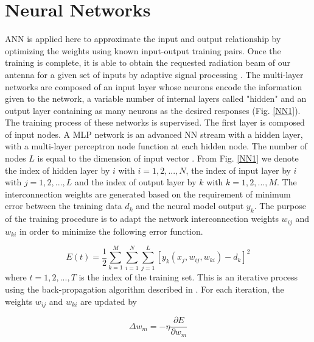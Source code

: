 \documentclass[conference]{IEEEtran}
\begin{document}
\section{Neural Networks}
ANN is applied here to approximate the input and output relationship by optimizing the weights using known input-output training pairs. Once the training is complete, it is able to obtain the requested radiation beam of our antenna for a given set of inputs by adaptive signal processing \cite{NN1}. The multi-layer networks are composed of an input layer whose neurons encode the information given to the network, a variable number of internal layers called "hidden" and an output layer containing as many neurons as the desired responses (Fig. \ref{NN1}). The training process of these networks is supervised. The first layer is composed of input nodes. A MLP network is an advanced NN stream with a hidden layer, with a multi-layer perceptron node function at each hidden node. The number of nodes $L$ is equal to the dimension of input vector \cite{a17}. From Fig. \ref{NN1} we denote the index of hidden layer by $i$ with $i = 1,2,...,N$, the index of input layer by $i$ with $j = 1,2,...,L$ and the index of output layer by $k$ with $k = 1,2,...,M$. The interconnection weights are generated based on the requirement of minimum error between the training data $d_k$ and the neural model output $y_k$. The purpose of the training procedure is to adapt the network interconnection weights $w_{ij}$ and $w_{ki}$ in order to minimize the following error function.

\begin{equation}
E\left( t \right) = \frac{1}{2}\sum\limits_{k = 1}^M {\sum\limits_{i = 1}^N {\sum\limits_{j = 1}^L {\left[ {y_k \left( {x_j ,w_{ij} ,w_{ki} } \right) - d_k } \right]^2 } } } 
\label{equ13}
\end{equation}
where $t = 1,2,...,T$  is the index of the training set. This is an iterative process using the back-propagation algorithm described in \cite{a12}. For each iteration, the weights $w_{ij}$ and $w_{ki}$ are updated by

\begin{equation}
\Delta w_m  =  - \eta \frac{{\partial E}}{{\partial w_m }}
\label{equ14}
\end{equation}

\begin{figure} [!ht]
\end{figure}
\end{document}
